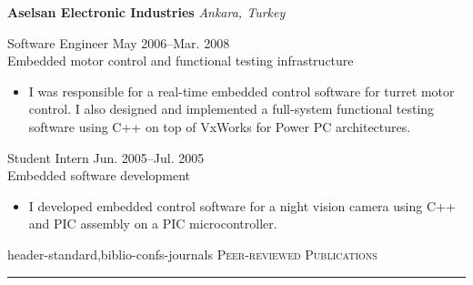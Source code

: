 \documentclass[10pt]{article}
\newcommand{\mysec}[1]{\vspace{2em}\textsc{\large #1}\vspace{1mm}\hrule\vspace{2mm}}
\newcommand{\mysub}[3]{\textbf{#1} {#2} \hfill {\em #3}}
\newcommand{\myssub}[1]{\hspace*{2mm}\parbox{163mm}{#1}\vspace*{2mm}}
\begin{document}
\mysub{Aselsan Electronic Industries}{}{Ankara, Turkey} \\
\myssub{\vspace{1mm}Software Engineer \hfill May 2006--Mar. 2008 \\
Embedded motor control and functional testing infrastructure
\vspace{-1mm}
\begin{itemize}
\setlength\itemsep{0em}
\item{I was responsible for a real-time embedded control software for turret motor control. I also designed and implemented a full-system functional testing software using C++ on top of VxWorks for Power PC architectures.}
\end{itemize}
}

\myssub{Student Intern \hfill Jun. 2005--Jul. 2005 \\
Embedded software development
\vspace{-1mm}
\begin{itemize}
\setlength\itemsep{0em}
\item{I developed embedded control software for a night vision camera using C++ and PIC assembly on a PIC microcontroller.}
\end{itemize}
}




\begin{btSect}{header-standard,biblio-confs-journals}
\mysec{Peer-reviewed Publications}
\btPrintAll
\end{btSect}
\end{document}

